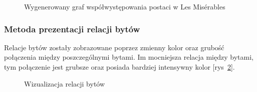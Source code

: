 \documentclass[12pt,a4paper]{article} %
\begin{document}
            \begin{figure}[h]
            \caption{Wygenerowany graf współwystępowania postaci w Les Mis\'erables}
            \label{fig:graph}
            \centering
            \end{figure}
            
        \newpage
        \subsubsection{Metoda prezentacji relacji bytów}

            Relacje bytów zostały zobrazowane poprzez zmienny kolor oraz grubość połączenia między poszczególnymi bytami. Im mocniejsza relacja między bytami, tym połączenie jest grubsze oraz posiada bardziej intensywny kolor [rys~\ref{fig:links}].
            
            \begin{figure}[h]
            \caption{Wizualizacja relacji bytów}
            \label{fig:links}
            \centering
            \end{figure}
            
\end{document}
